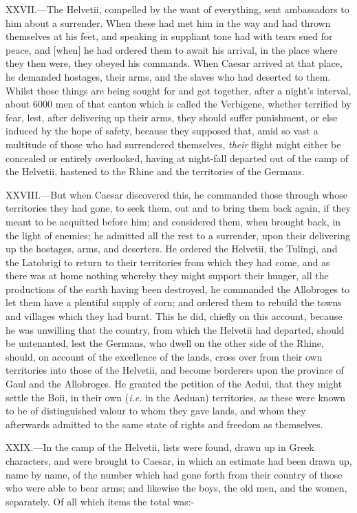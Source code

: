 XXVII.—The Helvetii, compelled by the want of everything, sent
ambassadors to him about a surrender. When these had met him in the way
and had thrown themselves at his feet, and speaking in suppliant tone
had with tears sued for peace, and [when] he had ordered them to await
his arrival, in the place where they then were, they obeyed his
commands. When Caesar arrived at that place, he demanded hostages, their
arms, and the slaves who had deserted to them. Whilst those things are
being sought for and got together, after a night's interval, about 6000
men of that canton which is called the Verbigene, whether terrified by
fear, lest, after delivering up their arms, they should suffer
punishment, or else induced by the hope of safety, because they supposed
that, amid so vast a multitude of those who had surrendered themselves,
\emph{their} flight might either be concealed or entirely overlooked, having
at night-fall departed out of the camp of the Helvetii, hastened to the
Rhine and the territories of the Germans.

XXVIII.—But when Caesar discovered this, he commanded those through
whose territories they had gone, to seek them, out and to bring them
back again, if they meant to be acquitted before him; and considered
them, when brought back, in the light of enemies; he admitted all the
rest to a surrender, upon their delivering up the hostages, arms, and
deserters. He ordered the Helvetii, the Tulingi, and the Latobrigi to
return to their territories from which they had come, and as there was
at home nothing whereby they might support their hunger, all the
productions of the earth having been destroyed, he commanded the
Allobroges to let them have a plentiful supply of corn; and ordered them
to rebuild the towns and villages which they had burnt. This he did,
chiefly on this account, because he was unwilling that the country, from
which the Helvetii had departed, should be untenanted, lest the Germans,
who dwell on the other side of the Rhine, should, on account of the
excellence of the lands, cross over from their own territories into
those of the Helvetii, and become borderers upon the province of Gaul
and the Allobroges. He granted the petition of the Aedui, that they
might settle the Boii, in their own (\emph{i.e.} in the Aeduan) territories,
as these were known to be of distinguished valour to whom they gave
lands, and whom they afterwards admitted to the same state of rights and
freedom as themselves.

XXIX.—In the camp of the Helvetii, lists were found, drawn up in Greek
characters, and were brought to Caesar, in which an estimate had been
drawn up, name by name, of the number which had gone forth from their
country of those who were able to bear arms; and likewise the boys, the
old men, and the women, separately. Of all which items the total was:-

